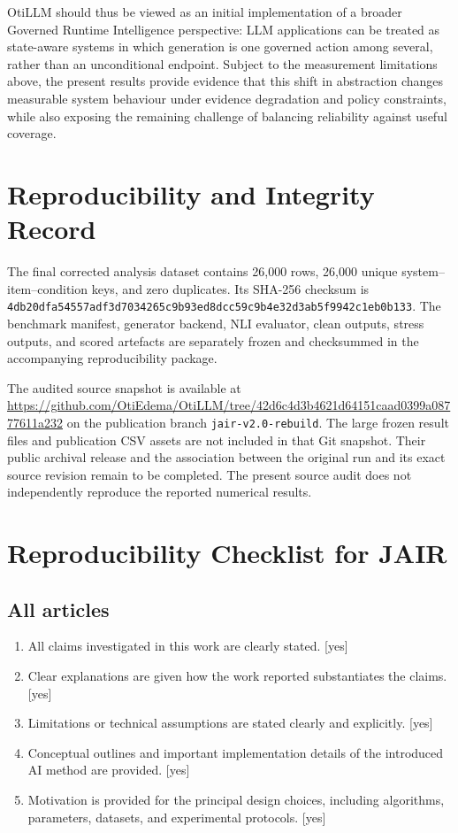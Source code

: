 \documentclass[manuscript, screen, review]{jair}
\begin{document}
OtiLLM should thus be viewed as an initial implementation of a broader Governed
Runtime Intelligence perspective: LLM applications can be treated as
state-aware systems in which generation is one governed action among several,
rather than an unconditional endpoint. Subject to the measurement limitations above, the present results provide evidence
that this shift in abstraction changes measurable system behaviour under
evidence degradation and policy constraints, while also exposing the remaining
challenge of balancing reliability against useful coverage.


\printbibliography

\appendix

\section{Reproducibility and Integrity Record}
The final corrected analysis dataset contains 26,000 rows, 26,000 unique
system--item--condition keys, and zero duplicates. Its SHA-256 checksum is
\nolinkurl{4db20dfa54557adf3d7034265c9b93ed8dcc59c9b4e32d3ab5f9942c1eb0b133}.
The benchmark manifest, generator backend, NLI evaluator, clean outputs,
stress outputs, and scored artefacts are separately frozen and checksummed in
the accompanying reproducibility package.

The audited source snapshot is available at
\url{https://github.com/OtiEdema/OtiLLM/tree/42d6c4d3b4621d64151caad0399a08777611a232}
on the publication branch \texttt{jair-v2.0-rebuild}. The large frozen result files
and publication CSV assets are not included in that Git snapshot. Their public
archival release and the association between the original run and its exact
source revision remain to be completed. The present source audit does not
independently reproduce the reported numerical results.

\section{Reproducibility Checklist for JAIR}

\subsection*{All articles}
\begin{enumerate}
\item All claims investigated in this work are clearly stated. [yes]
\item Clear explanations are given how the work reported substantiates the claims. [yes]
\item Limitations or technical assumptions are stated clearly and explicitly. [yes]
\item Conceptual outlines and important implementation details of the introduced AI method are provided. [yes]
\item Motivation is provided for the principal design choices, including algorithms, parameters, datasets, and experimental protocols. [yes]
\end{enumerate}
\end{document}
